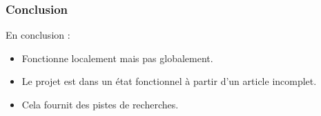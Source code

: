 \documentclass{beamer}
\begin{document}
	\begin{frame}
		\frametitle{Conclusion}
		En conclusion :
		\begin{itemize}
			\item Fonctionne localement mais pas globalement.
			\item Le projet est dans un état fonctionnel à partir d'un article incomplet.
			\item Cela fournit des pistes de recherches.
		\end{itemize}
	\end{frame}
	
\end{document}
